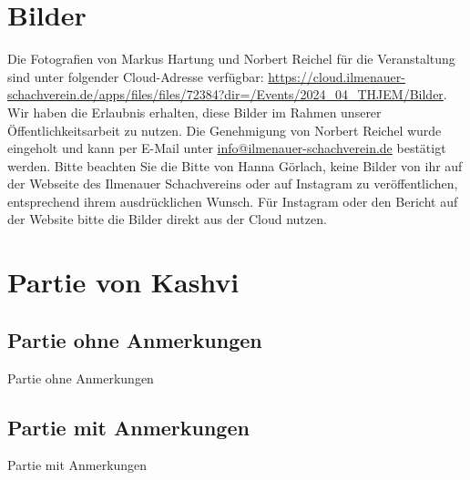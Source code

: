 \documentclass[a4paper,ngerman]{tui-algo-seminar}
\begin{document}
\clearpage


\section{Bilder}
Die Fotografien von Markus Hartung und Norbert Reichel für die Veranstaltung sind unter folgender Cloud-Adresse verfügbar: \url{https://cloud.ilmenauer-schachverein.de/apps/files/files/72384?dir=/Events/2024_04_THJEM/Bilder}. Wir haben die Erlaubnis erhalten, diese Bilder im Rahmen unserer Öffentlichkeitsarbeit zu nutzen. Die Genehmigung von Norbert Reichel wurde eingeholt und kann per E-Mail unter \href{mailto:info@ilmenauer-schachverein.de}{info@ilmenauer-schachverein.de} bestätigt werden.
Bitte beachten Sie die Bitte von Hanna Görlach, keine Bilder von ihr auf der Webseite des Ilmenauer Schachvereins oder auf Instagram zu veröffentlichen, entsprechend ihrem ausdrücklichen Wunsch. Für Instagram oder den Bericht auf der Website bitte die Bilder direkt aus der Cloud nutzen.




\clearpage
\section{Partie von Kashvi}


\subsection{Partie ohne Anmerkungen}
Partie ohne Anmerkungen
\subsection{Partie mit Anmerkungen}

Partie mit Anmerkungen
\end{document}
